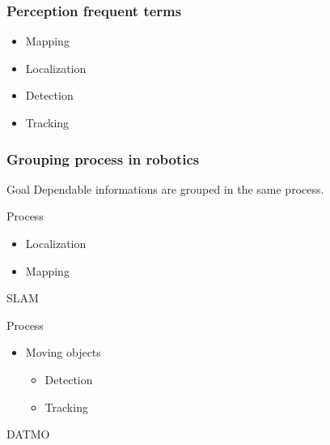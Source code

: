 \documentclass{beamer}
\begin{document}
	\begin{frame}
		\frametitle{Perception frequent terms}

		\begin{itemize}
			\item Mapping
			\item Localization
			\item Detection
			\item Tracking
		\end{itemize}				

	\end{frame}

	\begin{frame}
		\frametitle{Grouping process in robotics}
		
		\begin{block}{Goal}		
			Dependable informations are grouped in the same process.
		\end{block}			
		
		\begin{exampleblock}{Process}		
		
			\begin{itemize}
			\item Localization
			\item Mapping
			\end{itemize}			
		
			SLAM
		\end{exampleblock}					
				
		\begin{exampleblock}{Process}		
			\begin{itemize}
			\item Moving objects
				\begin{itemize}
				\item Detection
				\item Tracking
				\end{itemize}			
			\end{itemize}			
			DATMO
		\end{exampleblock}						
				
	\end{frame}
\end{document}
